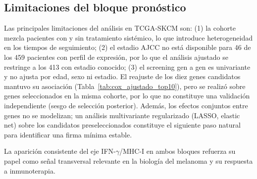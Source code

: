 \subsection{Limitaciones del bloque pronóstico}

Las principales limitaciones del análisis en TCGA-SKCM son: (1) la cohorte mezcla pacientes con y sin tratamiento sistémico, lo que introduce heterogeneidad en los tiempos de seguimiento; (2) el estadio AJCC no está disponible para 46 de los 459 pacientes con perfil de expresión, por lo que el análisis ajustado se restringe a los 413 con estadio conocido; (3) el screening gen a gen es univariante y no ajusta por edad, sexo ni estadio. El reajuste de los diez genes candidatos mantuvo su asociación (Tabla~\ref{tab:cox_ajustado_top10}), pero se realizó sobre genes seleccionados en la misma cohorte, por lo que no constituye una validación independiente (sesgo de selección posterior). Además, los efectos conjuntos entre genes no se modelizan; un análisis multivariante regularizado (LASSO, elastic net) sobre los candidatos preseleccionados constituye el siguiente paso natural para identificar una firma mínima estable.

La aparición consistente del eje IFN-$\gamma$/MHC-I en ambos bloques refuerza su papel como señal transversal relevante en la biología del melanoma y su respuesta a inmunoterapia.
